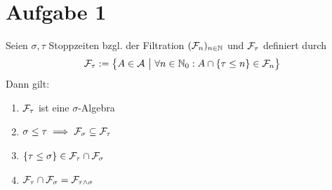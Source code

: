 \documentclass[12pt,a4paper]{article}
\author{Willi Sontopski}
\begin{document}

\section*{Aufgabe 1}
Seien $\sigma,\tau$ Stoppzeiten bzgl. der Filtration $(\mathcal{F}_n)_{n\in\mathbb{N}}$ und $\mathcal{F}_\tau$ definiert durch
\begin{align*}
\mathcal{F}_\tau:=\big\lbrace A\in\mathcal{A}~\big|~\forall n\in\mathbb{N}_0:A\cap\lbrace\tau\leq n\rbrace\in\mathcal{F}_n\big\rbrace
\end{align*}
Dann gilt:
\begin{enumerate}[label=\alph*)]
\item $\mathcal{F}_\tau$ ist eine $\sigma$-Algebra
\item $\begin{aligned}
\sigma\leq\tau\implies\mathcal{F}_\sigma\subseteq\mathcal{F}_\tau
\end{aligned}$
\item $\begin{aligned}
\lbrace\tau\leq\sigma\rbrace\in\mathcal{F}_\tau\cap\mathcal{F}_\sigma
\end{aligned}$
\item $\begin{aligned}
\mathcal{F}_\tau\cap\mathcal{F}_\sigma=\mathcal{F}_{\tau\wedge\sigma}
\end{aligned}$
\end{enumerate}
\end{document}
